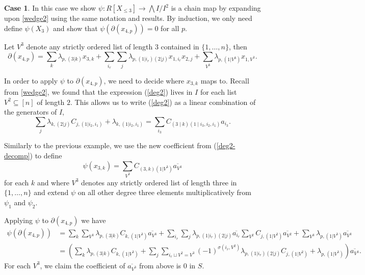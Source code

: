 \documentclass{amsart}
\theoremstyle{definition}
\newtheorem{case}[theorem]{Case}
\theoremstyle{remark}
\begin{document}
\begin{case}
\label{wedge3}
    In this case we show $\psi: R[ X_{\leq3}]\to\bigwedge I/I^2$ is a chain map by expanding upon \cref{wedge2} using the same notation and results. By induction, we only need define $\psi(X_3)$ and show that $\psi(\partial(x_{4,p}))=0$ for all $p$. 

    Let $V^3$ denote any strictly ordered list of length $3$ contained in $\{1,\ldots,n\}$, then
    \[
    \partial(x_{4,p})= \sum_{k}\lambda_{p,(3|k)}x_{3,k} + \sum_{i_r}\sum_{j} \lambda_{p,(1|i_r)(2|j)}x_{1,i_r}x_{2,j}+\sum_{V^3}\lambda_{p,(1|V^3)}x_{1,V^3}.
    \]
    
    In order to apply $\psi$ to $\partial(x_{4,p})$, we need to decide where $x_{3,k}$ maps to. Recall from \cref{wedge2}, we found that the expression (\ref{deg2}) lives in $I$ for each list $V^2\subseteq [n]$ of length $2$. This allows us to write (\ref{deg2}) as a linear combination of the generators of $I$, 
    \begin{equation}
    \label{deg2-decomp}
    \sum_{j}\lambda_{k,(2|j)}C_{j,(1|i_2,i_1)} + \lambda_{k, (1|i_2,i_1)} = \sum_{i_3}C_{(3\mid k)(1 \mid i_3,i_2,i_1)}a_{i_3}.
    \end{equation}
    
   
    Similarly to the previous example, we use the new coefficient from (\ref{deg2-decomp}) to define
    \[
    \psi\left( x_{3,k} \right)= \sum_{V^3} C_{(3,k)(1|V^3)}\overline{a_{V^3}}
    \]
    for each $k$ and where $V^3$ denotes any strictly ordered list of length three in $\{1,\ldots, n\}$ and extend $\psi$ on all other degree three elements multiplicatively from $\psi_1$ and $\psi_2$.
    
    Applying $\psi$ to $\partial(x_{4,p})$ we have 
\begin{align*}
\psi(\partial(x_{4,p})) &=\sum_{k}\sum_{V^3}\lambda_{p,(3|k)}C_{k,(1|V^3)}\overline{a_{V^3}} + \sum_{i_r}\sum_{j} \lambda_{p, (1|i_r)(2|j)}\overline{a_{i_r}}\sum_{V^2}C_{j,(1|V^2)} \overline{a_{V^2}}+ \sum_{V^3} \lambda_{p,(1|V^3)}\overline{a_{V^3}}\\
&=\left( \sum_{k}\lambda_{p,(3|k)}C_{k,(1|V^3)} + \sum_{j}\sum_{i_r \sqcup V^2 = V^3} (-1)^{\sigma(i_r,V^2
)}\lambda_{p, (1|i_r)(2|j)}C_{j,(1|V^2)} + \lambda_{p,(1|V^3)}\right)\overline{a_{V^3}}.
\end{align*}
    For each $V^3$, we claim the coefficient of $\overline{a_{V^3}}$ from above is $0$ in $S$.
  


\end{case}
\end{document}

